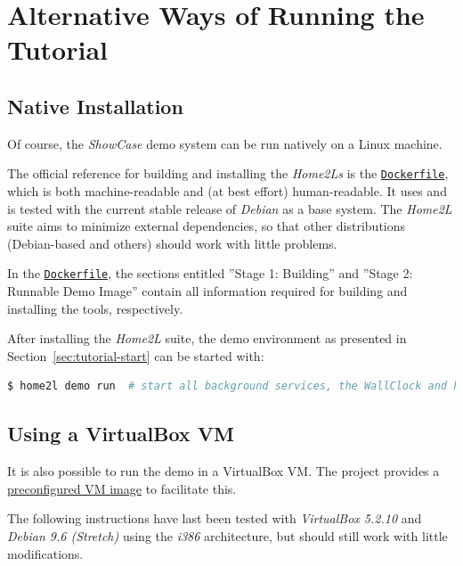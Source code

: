 \documentclass[12pt,english,parskip=half,headheight=19pt]{scrreprt}
\newcommand{\refdoc}[2]{\href{#1}{#2}}              %
\newcommand{\refsrc}[1]{\href{#1}{\texttt{#1}}}     %
\begin{document}
\clearpage
\section{Alternative Ways of Running the Tutorial}
\label{sec:tutorial-nodocker}


\subsection{Native Installation}
\label{sec:tutorial-nodocker-native}

Of course, the \textit{ShowCase} demo system can be run natively on a Linux machine.

The official reference for building and installing the \textit{Home2Ls} is the \refsrc{Dockerfile}, which is both machine-readable and (at best effort) human-readable. It uses and is tested with the current stable release of \textit{Debian} as a base system. The \textit{Home2L} suite aims to minimize external dependencies, so that other distributions (Debian-based and others) should work with little problems.

In the \refsrc{Dockerfile}, the sections entitled ''Stage 1: Building'' and ''Stage 2: Runnable Demo Image'' contain all information required for building and installing the tools, respectively.

After installing the \textit{Home2L} suite, the demo environment as presented in Section~\ref{sec:tutorial-start} can be started with:
\begin{lstlisting}[language=bash]
  $ home2l demo run  # start all background services, the WallClock and home2l-showhouse
\end{lstlisting}


\subsection{Using a VirtualBox VM}
\label{sec:tutorial-nodocker-vbox}


It is also possible to run the demo in a VirtualBox VM. The project provides a
\refdoc{home2l-showcase-vbox.tar.gz}{preconfigured VM image} to facilitate this.

The following instructions have last been tested with \textit{VirtualBox 5.2.10} and
\textit{Debian 9.6 (Stretch)} using the \textit{i386} architecture, but should still
work with little modifications.
\end{document}
